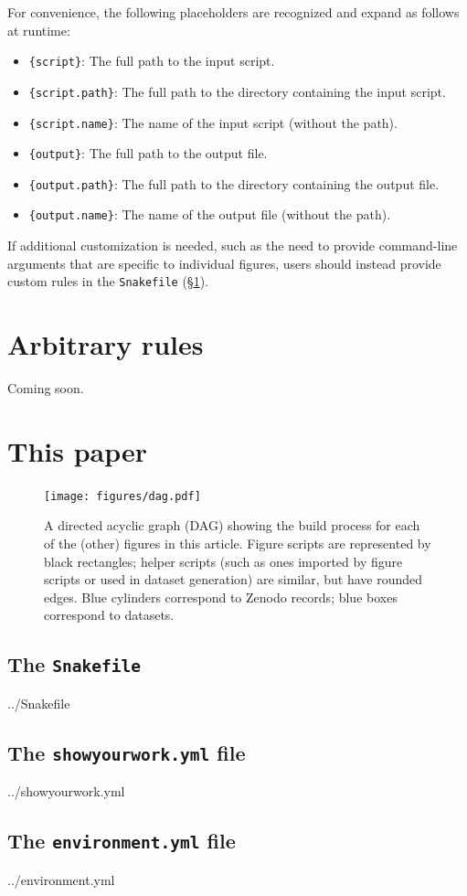 \documentclass[twocolumn]{aastex631}
\begin{document}
For convenience, the following placeholders are recognized and expand as follows at runtime:
%
\begin{itemize}
\item \texttt{\{script\}}: The full path to the input script.
\item \texttt{\{script.path\}}: The full path to the directory containing the input script.
\item \texttt{\{script.name\}}: The name of the input script (without the path).
\item \texttt{\{output\}}: The full path to the output file.
\item \texttt{\{output.path\}}: The full path to the directory containing the output file.
\item \texttt{\{output.name\}}: The name of the output file (without the path).
\end{itemize}
%
If additional customization is needed, such as the need to provide command-line arguments that are specific to individual figures, users should instead provide custom rules in the \texttt{Snakefile} (\S\ref{sec:arbitrary-rules}).

\section{Arbitrary rules}
\label{sec:arbitrary-rules}
%
Coming soon.

\section{This paper}

\begin{figure}[p!]
    \begin{centering}
        \texttt{[image: figures/dag.pdf]}
        \caption{
            A directed acyclic graph (DAG) showing the build process for each of the (other) figures in this article. 
            Figure scripts are represented by black rectangles; helper scripts (such as ones imported by figure scripts or used in dataset generation) are similar, but have rounded edges.
            Blue cylinders correspond to Zenodo records; blue boxes correspond to datasets.
        }
        \label{fig*:dag}
    \end{centering}
\end{figure}

\subsection{The \texttt{Snakefile}}
\label{sec:Snakefile}
%

{../Snakefile}

\subsection{The \texttt{showyourwork.yml} file}
\label{sec:showyourworkyml}
%

{../showyourwork.yml}

\subsection{The \texttt{environment.yml} file}
\label{sec:environmentyml}
%

{../environment.yml}


\end{document}
